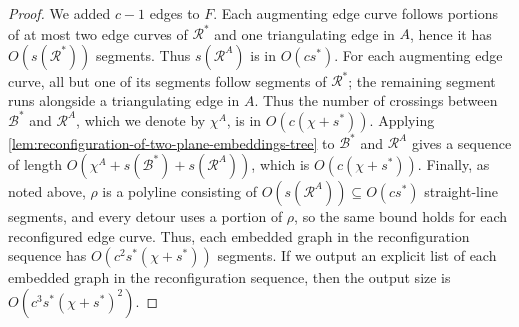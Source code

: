\documentclass[a4paper,USenglish,cleveref,colorlinks=true,urlcolor=black,linkcolor=black,citecolor=black,thm-restate,authorcolumns]{lipics-v2021}
\theoremstyle{claimstyle}
\begin{document}
\begin{proof}
    We added $c-1$ edges to $F$. Each augmenting edge curve follows portions of at most two edge curves of $\mathcal R^*$ and one triangulating edge in $A$, hence it has $O(s({\mathcal R}^*))$ segments. Thus $s({\mathcal R}^A)$ is in $O(c s^*)$.
    For each augmenting edge curve,
    all but one of its segments follow segments of
    ${\mathcal R}^*$;
    the remaining segment runs alongside a triangulating edge in $A$.
    Thus the number of crossings between $\mathcal B^*$ and ${\mathcal R}^A$,
    which we denote by $\chi^A$, is in $O(c ( \chi + s^*))$.
    Applying \cref{lem:reconfiguration-of-two-plane-embeddings-tree} to $\mathcal B^*$ and $\mathcal R^A$ gives a sequence of length $O(\chi^A+s(\mathcal B^*)+s(\mathcal R^A))$, which is
    $O(c ( \chi + s^*))$.
    Finally, as noted above, $\rho$ is a polyline consisting of
    $O(s({\mathcal R}^A)) \subseteq O(c s^*)$ straight-line segments, and every detour uses a portion of $\rho$, so the same bound holds for each reconfigured edge curve.
    Thus, each embedded graph in the reconfiguration sequence has $O(c^2 s^*(\chi + s^*))$ segments.
    If we output an explicit list of each embedded graph in the reconfiguration sequence, then the output size is $O(c^3 s^*(\chi + s^*)^2)$.
\end{proof}



\corhighergenus*
\end{document}
